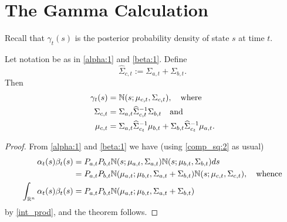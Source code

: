 \documentclass[12pt,leqno]{article}
\begin{document}
\section{The Gamma Calculation}
Recall that $\gamma_t(s)$ is the posterior probability density of state $s$
at time $t$. 
\begin{Thm}
  Let notation be as in \eqref{alpha:1} and \eqref{beta:1}.  Define
$$
  \widehat{\Sigma}_{c,t} := \Sigma_{a,t}+\Sigma_{b,t}.
  $$
  Then
  \begin{align*}
      \gamma_t(s) &= {\mathbb N}(s;\mu_{c,t},\Sigma_{c,t}),\quad\text{where}\\
      \Sigma_{c,t} &= \Sigma_{a,t}\widehat{\Sigma}_{c,t}^{-1}\Sigma_{b,t}
      \quad\text{and}\\
      \mu_{c,t} &= \Sigma_{a,t}\widehat{\Sigma}_{c_t}^{-1}\mu_{b,t} +
      \Sigma_{b,t}\widehat{\Sigma}_{c_t}^{-1}\mu_{a,t}.
  \end{align*}
\end{Thm}
\begin{proof}
  From \eqref{alpha:1} and \eqref{beta:1} we have (using \eqref{comp_sq:2}
  as usual)
  \begin{align*}
  \alpha_t(s)\beta_t(s) &= P_{a,t}P_{b,t}{\mathbb N}(s;\mu_{a,t},\Sigma_{a,t})
  {\mathbb N}(s;\mu_{b,t},\Sigma_{b,t})ds\\
  &= P_{a,t}P_{b,t}{\mathbb N}(\mu_{a,t};\mu_{b,t},\Sigma_{a,t}+\Sigma_{b,t}){\mathbb N}(s;\mu_{c,t},
  \Sigma_{c,t}), \quad\text{whence}\\
  \int_{{\mathbb R}^n}\alpha_t(s)\beta_t(s) &= P_{a,t}P_{b,t}{\mathbb N}(\mu_{a,t};\mu_{b,t},\Sigma_{a,t}+\Sigma_{b,t})
  \end{align*}
by \eqref{int_prod}, and the theorem follows.
\end{proof}
\end{document}
